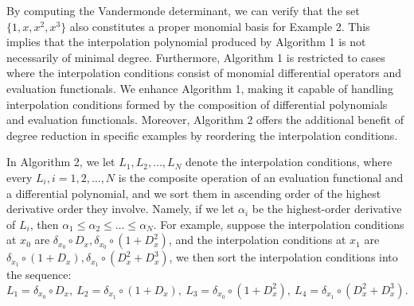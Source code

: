 \documentclass[preprint,12pt]{elsarticle}
\begin{document}
By computing the Vandermonde determinant, we can verify that the set $\{1, x, x^2, x^3\}$ also constitutes a proper monomial basis for Example 2.
This implies that the interpolation polynomial produced by Algorithm 1 is not necessarily of minimal degree.
Furthermore, Algorithm 1 is restricted to cases where the interpolation conditions consist of monomial differential operators and evaluation functionals.
We enhance Algorithm 1, making it capable of handling interpolation conditions formed by the composition of differential polynomials and evaluation functionals.
Moreover, Algorithm 2 offers the additional benefit of degree reduction in specific examples by reordering the interpolation conditions.

In Algorithm 2, we let $L_1,L_2,\dots,L_N$  denote the interpolation conditions, where every $L_i, i=1,2,\dots,N$ is the composite operation of an evaluation functional and a differential polynomial, and we sort them in ascending order of the highest derivative order they involve.  
Namely, if we let $\alpha_i$ be the highest-order derivative of $L_i$, then $\alpha_1\leq \alpha_2\leq\dots\leq \alpha_N$.
For example, suppose the interpolation conditions at $x_0$ are $\delta_{x_0}\circ D_x, \delta_{x_0}\circ (1+D_x^2)$, and the interpolation conditions at $x_1$ are $\delta_{x_1}\circ (1+D_x), \delta_{x_1}\circ (D_x^2+D_x^3)$, we then sort the interpolation conditions into the sequence:
\begin{displaymath}
L_1=\delta_{x_0}\circ D_x,\ 
L_2=\delta_{x_1}\circ (1+D_x),\ L_3=\delta_{x_0}\circ (1+D_x^2),\ L_4=\delta_{x_1}\circ (D_x^2+D_x^3). 
\end{displaymath}
\end{document}
